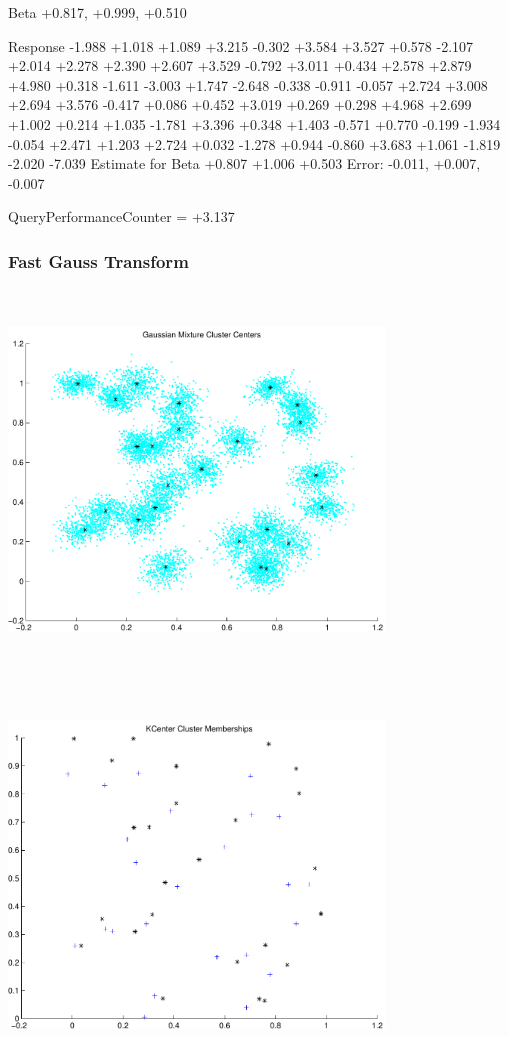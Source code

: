 \documentclass[9pt]{article}
\theoremstyle{plain}
\theoremstyle{definition}
\theoremstyle{remark}
\numberwithin{equation}{section}
\begin{document}
Beta
+0.817, +0.999, +0.510

Response
-1.988
+1.018
+1.089
+3.215
-0.302
+3.584
+3.527
+0.578
-2.107
+2.014
+2.278
+2.390
+2.607
+3.529
-0.792
+3.011
+0.434
+2.578
+2.879
+4.980
+0.318
-1.611
-3.003
+1.747
-2.648
-0.338
-0.911
-0.057
+2.724
+3.008
+2.694
+3.576
-0.417
+0.086
+0.452
+3.019
+0.269
+0.298
+4.968
+2.699
+1.002
+0.214
+1.035
-1.781
+3.396
+0.348
+1.403
-0.571
+0.770
-0.199
-1.934
-0.054
+2.471
+1.203
+2.724
+0.032
-1.278
+0.944
-0.860
+3.683
+1.061
-1.819
-2.020
-7.039
Estimate for Beta
+0.807
+1.006
+0.503
Error:
-0.011, +0.007, -0.007


QueryPerformanceCounter  =  +3.137
\subsubsection{Fast Gauss Transform}
\includegraphics[width=10.0cm,height=10.0cm]{GaussianMixture_ClusterCenters25_Centers.pdf}

\includegraphics[width=10.0cm,height=10.0cm]{KCenterClusterMemberships_25_Centers.pdf}
\end{document}

